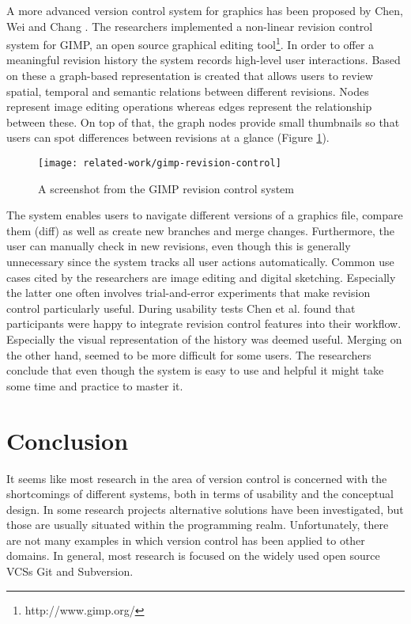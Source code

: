 A more advanced version control system for graphics has been proposed by Chen, Wei and Chang \cite{chen_nonlinear_2011}. The researchers implemented a non-linear revision control system for GIMP, an open source graphical editing tool\footnote{http://www.gimp.org/}. In order to offer a meaningful revision history the system records high-level user interactions. Based on these a graph-based representation is created that allows users to review spatial, temporal and semantic relations between different revisions. Nodes represent image editing operations whereas edges represent the relationship between these. On top of that, the graph nodes provide small thumbnails so that users can spot differences between revisions at a glance (Figure \ref{fig:gimp-rev-control}).

\begin{figure}[h!]
 \centering
 \texttt{[image: related-work/gimp-revision-control]}
 \caption{A screenshot from the GIMP revision control system}
 \label{fig:gimp-rev-control}
\end{figure}


The system enables users to navigate different versions of a graphics file, compare them (diff) as well as create new branches and merge changes. Furthermore, the user can manually check in new revisions, even though this is generally unnecessary since the system tracks all user actions automatically. Common use cases cited by the researchers are image editing and digital sketching. Especially the latter one often involves trial-and-error experiments that make revision control particularly useful. During usability tests Chen et al. found that participants were happy to integrate revision control features into their workflow. Especially the visual representation of the history was deemed useful. Merging on the other hand, seemed to be more difficult for some users. The researchers conclude that even though the system is easy to use and helpful it might take some time and practice to master it.

\section{Conclusion}
It seems like most research in the area of version control is concerned with the shortcomings of different systems, both in terms of usability and the conceptual design. In some research projects alternative solutions have been investigated, but those are usually situated within the programming realm. Unfortunately, there are not many examples in which version control has been applied to other domains. In general, most research is focused on the widely used open source VCSs Git and Subversion.

